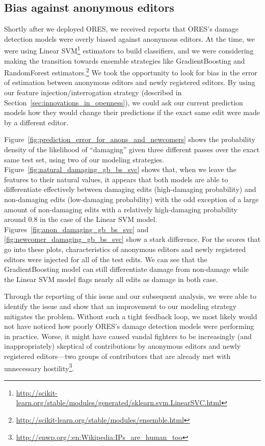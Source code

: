 \subsection{Bias against anonymous editors}
Shortly after we deployed ORES, we received reports that ORES's damage detection models were overly biased against anonymous editors.  At the time, we were using Linear SVM\footnote{\url{http://scikit-learn.org/stable/modules/generated/sklearn.svm.LinearSVC.html}} estimators to build classifiers, and we were considering making the transition towards ensemble strategies like GradientBoosting and RandomForest estimators.\footnote{\url{http://scikit-learn.org/stable/modules/ensemble.html}}  We took the opportunity to look for bias in the error of estimation between anonymous editors and newly registered editors.  By using our feature injection/interrogation strategy (described in Section~\ref{sec:innovations_in_openness}), we could ask our current prediction models how they would change their predictions if the exact same edit were made by a different editor.



Figure~\ref{fig:prediction_error_for_anons_and_newcomers} shows the probability density of the likelihood of ``damaging'' given three different passes over the exact same test set, using two of our modeling strategies.  Figure~\ref{fig:natural_damaging_gb_bs_svc} shows that, when we leave the features to their natural values, it appears that both models are able to differentiate effectively between damaging edits (high-damaging probability) and non-damaging edits (low-damaging probability) with the odd exception of a large amount of non-damaging edits with a relatively high-damaging probability around 0.8 in the case of the Linear SVM model.  Figures~\ref{fig:anon_damaging_gb_bs_svc} and \ref{fig:newcomer_damaging_gb_bs_svc} show a stark difference.  For the scores that go into these plots, characteristics of anonymous editors and newly registered editors were injected for all of the test edits.  We can see that the GradientBoosting model can still differentiate damage from non-damage while the Linear SVM model flags nearly all edits as damage in both case.

Through the reporting of this issue and our subsequent analysis, we were able to identify the issue and show that an improvement to our modeling strategy mitigates the problem.  Without such a tight feedback loop, we most likely would not have noticed how poorly ORES's damage detection models were performing in practice.  Worse, it might have caused vandal fighters to be increasingly (and inappropriately) skeptical of contributions by anonymous editors and newly registered editors---two groups of contributors that are already met with unnecessary hostility\footnote{\url{http://enwp.org/:en:Wikipedia:IPs_are_human_too}}\cite{halfaker2013rise}.

